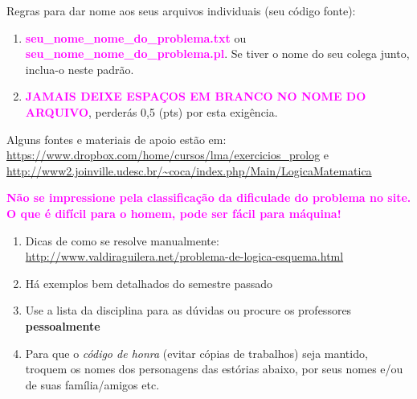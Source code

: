 \documentclass[a4paper,12pt]{article}
\begin{document}
\begin{flushleft}
\vspace{0.5cm}
 Regras para dar nome aos seus arquivos individuais (seu código fonte):

\begin{enumerate}
  \item \textcolor{magenta}{\textbf{seu\_nome\_nome\_do\_problema.txt}} ou 
  \textcolor{magenta}{\textbf{seu\_nome\_nome\_do\_problema.pl}}. Se tiver o nome do seu colega junto, inclua-o neste padrão.
  
  \item \textcolor{magenta}{\textbf{JAMAIS DEIXE ESPAÇOS EM BRANCO NO NOME DO ARQUIVO}}, perderás 0,5 (pts) por esta exigência.
\end{enumerate}


\vspace{0.5cm}
 Alguns fontes e materiais de apoio estão em:
 \url{https://www.dropbox.com/home/cursos/lma/exercicios_prolog} e \\
  \url{http://www2.joinville.udesc.br/~coca/index.php/Main/LogicaMatematica}


\vspace{0.5cm}
 \textbf{\textcolor{magenta}{Não se impressione pela classificação da dificulade do problema no site. O que é difícil para o homem, pode ser fácil para máquina!}}

\end{flushleft}

\begin{enumerate}
\setlength\itemsep{0.1cm}
\item Dicas de como se resolve manualmente:\\
\url{http://www.valdiraguilera.net/problema-de-logica-esquema.html}

\item Há exemplos bem detalhados do semestre passado

\item Use a lista da disciplina para as dúvidas ou procure os professores \textbf{pessoalmente}

\item Para que o \textit{código de honra} (evitar cópias de trabalhos) seja mantido, troquem os nomes dos personagens das estórias abaixo, por seus nomes e/ou de suas família/amigos etc. 

\end{enumerate}

\newpage
\end{document}
